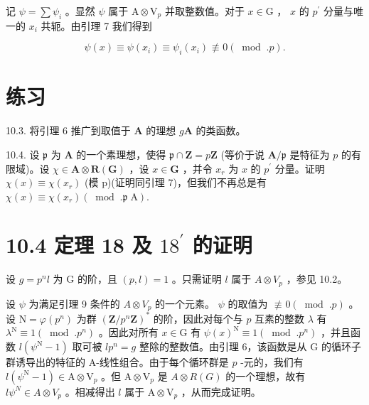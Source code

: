 \documentclass[10pt]{article}
\begin{document}
记 \(\psi  = \sum {\psi }_{i}\) 。显然 \(\psi\) 属于 \(\mathrm{A} \otimes  {\mathrm{V}}_{p}\) 并取整数值。对于 \(x \in  \mathrm{G}\) ， \(x\) 的 \({p}^{\prime }\) 分量与唯一的 \({x}_{i}\) 共轭。由引理 7 我们得到

\[
\psi \left( x\right)  \equiv  \psi \left( {x}_{i}\right)  \equiv  {\psi }_{i}\left( {x}_{i}\right)  \text{ ≢ } 0\left( {\;\operatorname{mod}\;.p}\right) .
\]

\section*{练习}

10.3. 将引理 6 推广到取值于 \(\mathbf{A}\) 的理想 \(g\mathbf{A}\) 的类函数。

10.4. 设 \(\mathfrak{p}\) 为 \(\mathbf{A}\) 的一个素理想，使得 \(\mathfrak{p} \cap  \mathbf{Z} = p\mathbf{Z}\) (等价于说 \(\mathbf{A}/\mathfrak{p}\) 是特征为 \(p\) 的有限域)。设 \(\chi  \in  \mathbf{A} \otimes  \mathbf{R}\left( \mathbf{G}\right)\) ，设 \(x \in  \mathbf{G}\) ，并令 \({x}_{r}\) 为 \(x\) 的 \({p}^{\prime }\) 分量。证明 \(\chi \left( x\right)  \equiv  \chi \left( {x}_{r}\right)\) (模 p)(证明同引理 7)，但我们不再总是有 \(\chi \left( x\right)  \equiv  \chi \left( {x}_{r}\right) \left( {{\;\operatorname{mod}\;.}\mathfrak{p}\mathrm{\;A}}\right) .\)

\section*{10.4 定理 18 及 \({18}^{\prime }\) 的证明}

设 \(g = {p}^{n}l\) 为 \(\mathrm{G}\) 的阶，且 \(\left( {p,l}\right)  = 1\) 。只需证明 \(l\) 属于 \(A \otimes  {V}_{p}\) ，参见 10.2。

设 \(\psi\) 为满足引理 9 条件的 \(A \otimes  {V}_{p}\) 的一个元素。 \(\psi\) 的取值为 \(\text{ ≢ } 0\left( {{\;\operatorname{mod}\;.}p}\right)\) 。设 \(\mathrm{N} = \varphi \left( {p}^{n}\right)\) 为群 \({\left( \mathbf{Z}/{p}^{n}\mathbf{Z}\right) }^{ * }\) 的阶，因此对每个与 \(p\) 互素的整数 \(\lambda\) 有 \({\lambda }^{\mathrm{N}} \equiv  1\left( {{\;\operatorname{mod}\;.}{p}^{n}}\right)\) 。因此对所有 \(x \in  \mathrm{G}\) 有 \(\psi {\left( x\right) }^{\mathrm{N}} \equiv  1\left( {{\;\operatorname{mod}\;.}{p}^{n}}\right)\) ，并且函数 \(l\left( {{\psi }^{\mathrm{N}} - 1}\right)\) 取可被 \(l{p}^{n} = g\) 整除的整数值。由引理 6，该函数是从 G 的循环子群诱导出的特征的 A-线性组合。由于每个循环群是 \(p\) -元的，我们有 \(l\left( {{\psi }^{\mathrm{N}} - 1}\right)  \in  \mathrm{A} \otimes  {\mathrm{V}}_{p}\) 。但 \(\mathrm{A} \otimes  {\mathrm{V}}_{p}\) 是 \(A \otimes  R\left( G\right)\) 的一个理想，故有 \(l{\psi }^{N} \in  A \otimes  {V}_{p}\) 。相减得出 \(l\) 属于 \(\mathrm{A} \otimes  {\mathrm{V}}_{p}\) ，从而完成证明。
\end{document}
